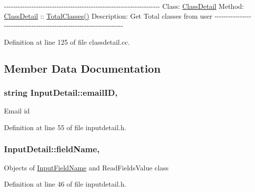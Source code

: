 -\/-\/-\/-\/-\/-\/-\/-\/-\/-\/-\/-\/-\/-\/-\/-\/-\/-\/-\/-\/-\/-\/-\/-\/-\/-\/-\/-\/-\/-\/-\/-\/-\/-\/-\/-\/-\/-\/-\/-\/-\/-\/-\/-\/-\/-\/-\/-\/-\/-\/-\/-\/-\/-\/-\/-\/-\/-\/-\/-\/-\/-\/-\/-\/-\/-\/-\/-\/ Class\-: \hyperlink{classClassDetail}{Class\-Detail} Method\-: \hyperlink{classClassDetail}{Class\-Detail} \-:\-: \hyperlink{classClassDetail_a7f2913b5735282db82ab3ff363b14ce4}{Total\-Classes()} Description\-: Get Total classes from user -\/-\/-\/-\/-\/-\/-\/-\/-\/-\/-\/-\/-\/-\/-\/-\/-\/-\/-\/-\/-\/-\/-\/-\/-\/-\/-\/-\/-\/-\/-\/-\/-\/-\/-\/-\/-\/-\/-\/-\/-\/-\/-\/-\/-\/-\/-\/-\/-\/-\/-\/-\/-\/-\/-\/-\/-\/-\/-\/-\/-\/-\/-\/-\/-\/-\/-\/-\/ 

Definition at line 125 of file classdetail.\-cc.



\subsection{Member Data Documentation}
\hypertarget{classInputDetail_ad3f1db4fddbe0d4efbf1d5bc74d52257}{
\subsubsection[{email\-I\-D}]{\setlength{\rightskip}{0pt plus 5cm}string Input\-Detail\-::email\-I\-D\hspace{0.3cm}{\ttfamily [protected]}, {\ttfamily [inherited]}}}\label{classInputDetail_ad3f1db4fddbe0d4efbf1d5bc74d52257}
Email id 

Definition at line 55 of file inputdetail.\-h.

\hypertarget{classInputDetail_ac6f85380c5152c406d483726382c4798}{
\subsubsection[{field\-Name}]{ Input\-Detail\-::field\-Name\hspace{0.3cm}{\ttfamily [protected]}, {\ttfamily [inherited]}}}\label{classInputDetail_ac6f85380c5152c406d483726382c4798}
Objects of \hyperlink{classInputFieldName}{Input\-Field\-Name} and Read\-Fields\-Value class 

Definition at line 46 of file inputdetail.\-h.

